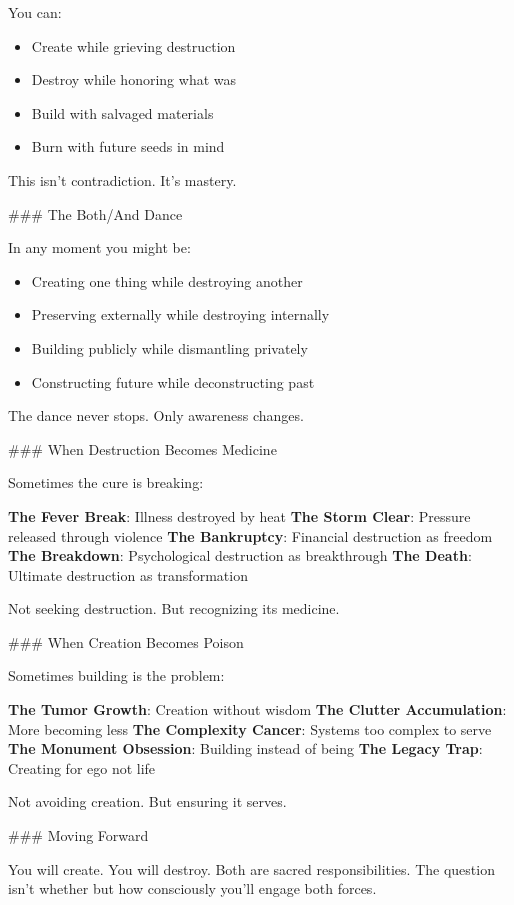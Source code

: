 \documentclass[12pt]{book}
\begin{document}
You can:
\begin{itemize}
\item Create while grieving destruction
\item Destroy while honoring what was
\item Build with salvaged materials
\item Burn with future seeds in mind

\end{itemize}
This isn't contradiction. It's mastery.

\#\#\# The Both/And Dance

In any moment you might be:
\begin{itemize}
\item Creating one thing while destroying another
\item Preserving externally while destroying internally
\item Building publicly while dismantling privately
\item Constructing future while deconstructing past

\end{itemize}
The dance never stops. Only awareness changes.

\#\#\# When Destruction Becomes Medicine

Sometimes the cure is breaking:

\textbf{The Fever Break}: Illness destroyed by heat
\textbf{The Storm Clear}: Pressure released through violence
\textbf{The Bankruptcy}: Financial destruction as freedom
\textbf{The Breakdown}: Psychological destruction as breakthrough
\textbf{The Death}: Ultimate destruction as transformation

Not seeking destruction. But recognizing its medicine.

\#\#\# When Creation Becomes Poison

Sometimes building is the problem:

\textbf{The Tumor Growth}: Creation without wisdom
\textbf{The Clutter Accumulation}: More becoming less
\textbf{The Complexity Cancer}: Systems too complex to serve
\textbf{The Monument Obsession}: Building instead of being
\textbf{The Legacy Trap}: Creating for ego not life

Not avoiding creation. But ensuring it serves.

\#\#\# Moving Forward

You will create. You will destroy. Both are sacred responsibilities. The question isn't whether but how consciously you'll engage both forces.
\end{document}
